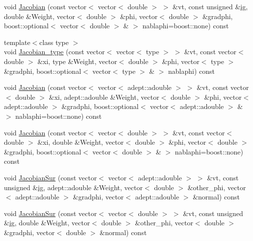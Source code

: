 \begin{DoxyCompactItemize}
\item 
void \mbox{\hyperlink{classfemus_1_1elem__type__3_d_a83c519de8adf50f547627123db1a82ee}{Jacobian}} (const vector$<$ vector$<$ double $>$ $>$ \&vt, const unsigned \&\mbox{\hyperlink{namespacefemus_a6df31099f676311de214a312d7043941}{ig}}, double \&Weight, vector$<$ double $>$ \&phi, vector$<$ double $>$ \&gradphi, boost\+::optional$<$ vector$<$ double $>$ \& $>$ nablaphi=boost\+::none) const
\item 
{\footnotesize template$<$class type $>$ }\\void \mbox{\hyperlink{classfemus_1_1elem__type__3_d_a8e2dffc8f5d0e5fa316b93218d331280}{Jacobian\+\_\+type}} (const vector$<$ vector$<$ type $>$ $>$ \&vt, const vector$<$ double $>$ \&xi, type \&Weight, vector$<$ double $>$ \&phi, vector$<$ type $>$ \&gradphi, boost\+::optional$<$ vector$<$ type $>$ \& $>$ nablaphi) const
\item 
void \mbox{\hyperlink{classfemus_1_1elem__type__3_d_a277615099e6e69b4aed9e1cd9e84817d}{Jacobian}} (const vector$<$ vector$<$ adept\+::adouble $>$ $>$ \&vt, const vector$<$ double $>$ \&xi, adept\+::adouble \&Weight, vector$<$ double $>$ \&phi, vector$<$ adept\+::adouble $>$ \&gradphi, boost\+::optional$<$ vector$<$ adept\+::adouble $>$ \& $>$ nablaphi=boost\+::none) const
\item 
void \mbox{\hyperlink{classfemus_1_1elem__type__3_d_a53f0fe22a3df82bab547a2578d66d7c6}{Jacobian}} (const vector$<$ vector$<$ double $>$ $>$ \&vt, const vector$<$ double $>$ \&xi, double \&Weight, vector$<$ double $>$ \&phi, vector$<$ double $>$ \&gradphi, boost\+::optional$<$ vector$<$ double $>$ \& $>$ nablaphi=boost\+::none) const
\item 
void \mbox{\hyperlink{classfemus_1_1elem__type__3_d_a8eea4f745f548cc10bb55848c4cd2ba3}{Jacobian\+Sur}} (const vector$<$ vector$<$ adept\+::adouble $>$ $>$ \&vt, const unsigned \&\mbox{\hyperlink{namespacefemus_a6df31099f676311de214a312d7043941}{ig}}, adept\+::adouble \&Weight, vector$<$ double $>$ \&other\+\_\+phi, vector$<$ adept\+::adouble $>$ \&gradphi, vector$<$ adept\+::adouble $>$ \&normal) const
\item 
void \mbox{\hyperlink{classfemus_1_1elem__type__3_d_a35ed7904fbe1fdc2998819384d709bdb}{Jacobian\+Sur}} (const vector$<$ vector$<$ double $>$ $>$ \&vt, const unsigned \&\mbox{\hyperlink{namespacefemus_a6df31099f676311de214a312d7043941}{ig}}, double \&Weight, vector$<$ double $>$ \&other\+\_\+phi, vector$<$ double $>$ \&gradphi, vector$<$ double $>$ \&normal) const
\item 

\end{DoxyCompactItemize}
